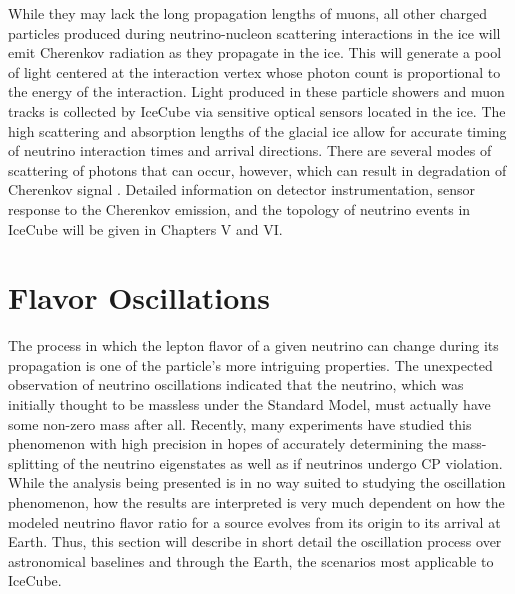 \documentclass{gatech-thesis}
\begin{document}
While they may lack the long propagation lengths of muons, all other charged particles produced during neutrino-nucleon scattering interactions in the ice will emit Cherenkov radiation as they propagate in the ice. This will generate a pool of light centered at the interaction vertex whose photon count is proportional to the energy of the interaction. Light produced in these particle showers and muon tracks is collected by IceCube via sensitive optical sensors located in the ice. The high scattering and absorption lengths of the glacial ice allow for accurate timing of neutrino interaction times and arrival directions. There are several modes of scattering of photons that can occur, however, which can result in degradation of Cherenkov signal \cite{2013arXiv1301.5361I}. Detailed information on detector instrumentation, sensor response to the Cherenkov emission, and the topology of neutrino events in IceCube will be given in Chapters V and VI.


\section{Flavor Oscillations}
The process in which the lepton flavor of a given neutrino can change during its propagation is one of the particle's more intriguing properties. The unexpected observation of neutrino oscillations indicated that the neutrino, which was initially thought to be massless under the Standard Model, must actually have some non-zero mass after all. Recently, many experiments have studied this phenomenon with high precision in hopes of accurately determining the mass-splitting of the neutrino eigenstates as well as if neutrinos undergo CP violation. While the analysis being presented is in no way suited to studying the oscillation phenomenon, how the results are interpreted is very much dependent on how the modeled neutrino flavor ratio for a source evolves from its origin to its arrival at Earth. Thus, this section will describe in short detail the oscillation process over astronomical baselines and through the Earth, the scenarios most applicable to IceCube.
\end{document}
